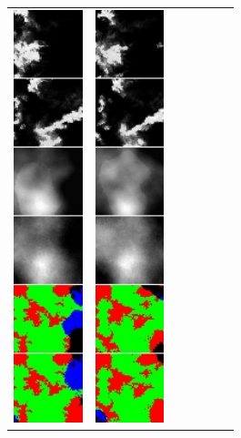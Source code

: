 \begin{figure}[h]
\begin{tabular}{lllllll}
\includegraphics[width=20mm]{abb/prediction/104_maxCont}&
\includegraphics[width=20mm]{abb/prediction/105_maxCont}&

\end{tabular}
\end{figure}
